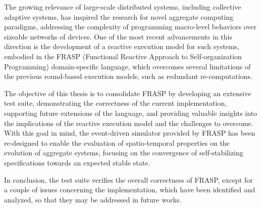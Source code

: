 
The growing relevance of large-scale distributed systems, including collective
adaptive systems, has inspired the research for novel aggregate computing
paradigms, addressing the complexity of programming macro-level behaviors over
sizeable networks of devices. One of the most recent advancements in this
direction is the development of a reactive execution model for such systems,
embodied in the FRASP (Functional Reactive Approach to Self-organization
Programming) domain-specific language, which overcomes several limitations of
the previous round-based execution models, such as redundant re-computations.

The objective of this thesis is to consolidate FRASP by developing an extensive
test suite, demonstrating the correctness of the current implementation,
supporting future extensions of the language, and providing valuable insights
into the implications of the reactive execution model and the challenges to
overcome. With this goal in mind, the event-driven simulator provided by FRASP
has been re-designed to enable the evaluation of spatio-temporal properties on
the evolution of aggregate systems, focusing on the convergence of
self-stabilizing specifications towards an expected stable state.

In conclusion, the test suite verifies the overall correctness of FRASP, except
for a couple of issues concerning the implementation, which have been
identified and analyzed, so that they may be addressed in future works.